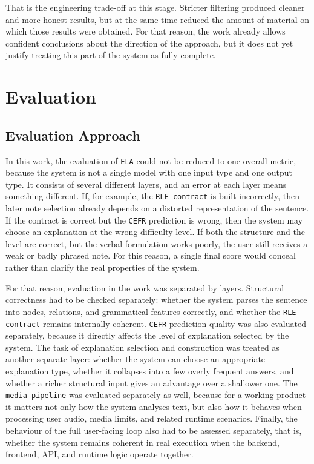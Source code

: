 \documentclass[12pt,a4paper,oneside]{report}
\begin{document}
That is the engineering trade-off at this stage. Stricter filtering produced cleaner and more honest results, but at the same time reduced the amount of material on which those results were obtained. For that reason, the work already allows confident conclusions about the direction of the approach, but it does not yet justify treating this part of the system as fully complete.


\chapter{Evaluation}
\section{Evaluation Approach}
In this work, the evaluation of \texttt{ELA} could not be reduced to one overall metric, because the system is not a single model with one input type and one output type. It consists of several different layers, and an error at each layer means something different. If, for example, the \texttt{RLE contract} is built incorrectly, then later note selection already depends on a distorted representation of the sentence. If the contract is correct but the \texttt{CEFR} prediction is wrong, then the system may choose an explanation at the wrong difficulty level. If both the structure and the level are correct, but the verbal formulation works poorly, the user still receives a weak or badly phrased note. For this reason, a single final score would conceal rather than clarify the real properties of the system.

For that reason, evaluation in the work was separated by layers. Structural correctness had to be checked separately: whether the system parses the sentence into nodes, relations, and grammatical features correctly, and whether the \texttt{RLE contract} remains internally coherent. \texttt{CEFR} prediction quality was also evaluated separately, because it directly affects the level of explanation selected by the system. The task of explanation selection and construction was treated as another separate layer: whether the system can choose an appropriate explanation type, whether it collapses into a few overly frequent answers, and whether a richer structural input gives an advantage over a shallower one. The \texttt{media pipeline} was evaluated separately as well, because for a working product it matters not only how the system analyses text, but also how it behaves when processing user audio, media limits, and related runtime scenarios. Finally, the behaviour of the full user-facing loop also had to be assessed separately, that is, whether the system remains coherent in real execution when the backend, frontend, API, and runtime logic operate together.
\end{document}
